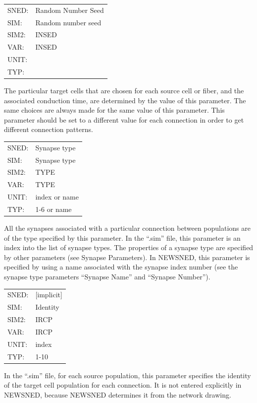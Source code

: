 \documentclass[12pt,openany,oneside]{book}
\begin{document}
\begin{flushleft}
\begin{tabular}{@{}ll@{}}
SNED: & Random Number Seed\\
SIM: & Random number seed\\
SIM2: & INSED\\
VAR: & INSED\\
UNIT: &\\
TYP: &\\
\end{tabular}
\end{flushleft}
\noindent
The particular target cells that are chosen for each source cell or
fiber, and the associated conduction time, are determined by the value
of this parameter.  The same choices are always made for the same
value of this parameter.  This parameter should be set to a different
value for each connection in order to get different connection
patterns.
\filbreak
\vspace{\baselineskip}

\begin{flushleft}
\begin{tabular}{@{}ll@{}}
SNED: & Synapse type\\
SIM: & Synapse type\\
SIM2: & TYPE\\
VAR: & TYPE\\
UNIT: & index or name\\
TYP: & 1-6 or name\\
\end{tabular}
\end{flushleft}
\noindent
All the synapses associated with a particular connection between
populations are of the type specified by this parameter.  In the
``.sim'' file, this parameter is an index into the list of synapse
types.  The properties of a synapse type are specified by other
parameters (see Synapse Parameters).  In NEWSNED, this parameter is
specified by using a name associated with the synapse index number
(see the synapse type parameters ``Synapse Name'' and ``Synapse
Number'').
\filbreak
\vspace{\baselineskip}

\begin{flushleft}
\begin{tabular}{@{}ll@{}}
SNED: & [implicit]\\
SIM: & Identity\\
SIM2: & IRCP\\
VAR: & IRCP\\
UNIT: & index\\
TYP: & 1-10\\
\end{tabular}
\end{flushleft}
\noindent
In the ``.sim'' file, for each source population, this parameter
specifies the identity of the target cell population for each
connection.  It is not entered explicitly in NEWSNED, because NEWSNED
determines it from the network drawing.
\filbreak
\vspace{\baselineskip}
\end{document}
